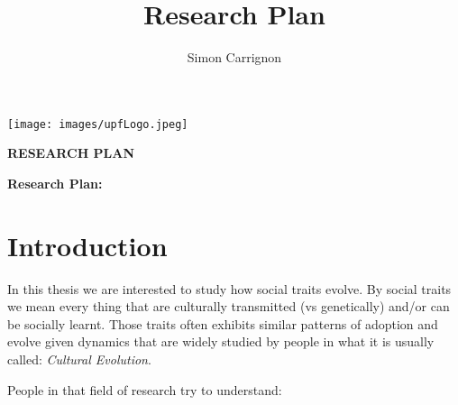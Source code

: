 \documentclass[a4paper]{article}
\title{Research Plan}
\author{Simon Carrignon}
\begin{document}
\vspace{-1cm}
\hspace{-1cm}
\begin{minipage}{.5\textwidth}
    \noindent \texttt{[image: images/upfLogo.jpeg]} 
\end{minipage}
\hfill
\begin{minipage}{.5\textwidth}
    \flushright
    \textbf{ \Large RESEARCH PLAN }
\end{minipage}

\vspace{3cm}

\hspace{-1cm}
\vspace{2cm}

\noindent\textbf{\LARGE Research Plan: }


\section*{Introduction}
In this thesis we are interested to study how social traits evolve. By social traits we mean every thing that are culturally transmitted (vs genetically) and/or can be socially learnt. Those traits often exhibits similar patterns of adoption and evolve given dynamics that are widely studied by people in what it is usually called: \emph{Cultural Evolution}.

People in that field of research try to understand:\\
\end{document}

